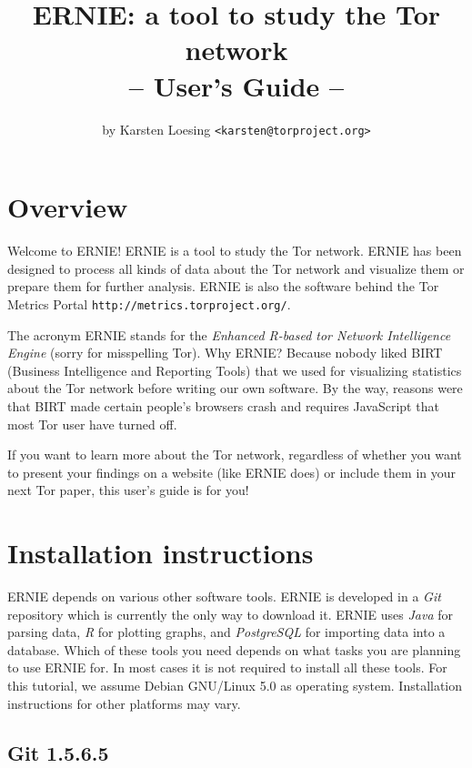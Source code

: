 \documentclass{article}
\begin{document}
\title{ERNIE: a tool to study the Tor network\\-- User's Guide --}
\author{by Karsten Loesing \texttt{<karsten@torproject.org>}}
\maketitle

\section{Overview}

Welcome to ERNIE!
ERNIE is a tool to study the Tor network.
ERNIE has been designed to process all kinds of data about the Tor network
and visualize them or prepare them for further analysis.
ERNIE is also the software behind the Tor Metrics Portal
\verb+http://metrics.torproject.org/+.

The acronym ERNIE stands for the \emph{Enhanced R-based tor Network
Intelligence Engine} (sorry for misspelling Tor).
Why ERNIE?
Because nobody liked BIRT (Business Intelligence and Reporting Tools) that
we used for visualizing statistics about the Tor network before writing
our own software.
By the way, reasons were that BIRT made certain people's browsers crash
and requires JavaScript that most Tor user have turned off.

If you want to learn more about the Tor network, regardless of whether you
want to present your findings on a website (like ERNIE does) or include
them in your next Tor paper, this user's guide is for you!

\section{Installation instructions}

ERNIE depends on various other software tools. ERNIE is developed in a
\emph{Git} repository which is currently the only way to download it.
ERNIE uses \emph{Java} for parsing data, \emph{R} for plotting graphs,
and \emph{PostgreSQL} for importing data into a database.
Which of these tools you need depends on what tasks you are planning to
use ERNIE for.
In most cases it is not required to install all these tools.
For this tutorial, we assume Debian GNU/Linux 5.0 as operating system.
Installation instructions for other platforms may vary.

\subsection{Git 1.5.6.5}
\end{document}

